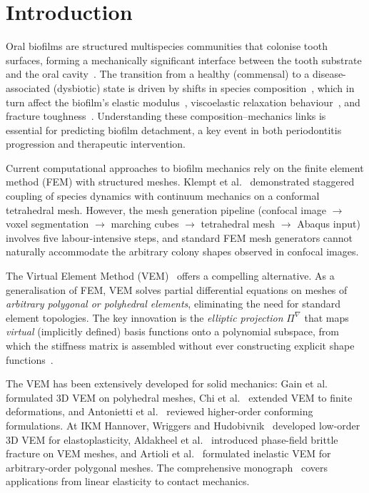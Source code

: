 \documentclass[smallextended]{svjour3}
\begin{document}

\section{Introduction}
\label{sec:intro}

Oral biofilms are structured multispecies communities that colonise tooth
surfaces, forming a mechanically significant interface between the
tooth substrate and the oral cavity~\cite{Flemming2010}.
The transition from a healthy (commensal) to a disease-associated
(dysbiotic) state is driven by shifts in species
composition~\cite{Heine2025}, which in turn affect the biofilm's
elastic modulus~\cite{Pattem2018,Pattem2021}, viscoelastic relaxation
behaviour~\cite{Peterson2015,Stoodley1999}, and fracture
toughness~\cite{Gloag2020a,Gloag2020b}.
Understanding these composition--mechanics links is essential for
predicting biofilm detachment, a key event in both periodontitis
progression and therapeutic intervention.

Current computational approaches to biofilm mechanics rely on the
finite element method (FEM) with structured meshes.
Klempt et al.~\cite{Klempt2024} demonstrated staggered coupling of
species dynamics with continuum mechanics on a conformal tetrahedral
mesh.
However, the mesh generation pipeline (confocal image $\to$ voxel
segmentation $\to$ marching cubes $\to$ tetrahedral mesh $\to$ Abaqus
input) involves five labour-intensive steps, and standard FEM mesh
generators cannot naturally accommodate the arbitrary colony shapes
observed in confocal images.

The Virtual Element Method
(VEM)~\cite{BeiraodaVeiga2013,BeiraodaVeiga2014} offers a compelling
alternative.
As a generalisation of FEM, VEM solves partial differential equations
on meshes of \emph{arbitrary polygonal or polyhedral elements},
eliminating the need for standard element topologies.
The key innovation is the \emph{elliptic projection}
$\Pi^\nabla$ that maps \emph{virtual} (implicitly defined)
basis functions onto a polynomial subspace, from which the
stiffness matrix is assembled without ever constructing
explicit shape functions~\cite{Sutton2017}.

The VEM has been extensively developed for solid mechanics:
Gain et al.~\cite{Gain2014} formulated 3D VEM on polyhedral meshes,
Chi et al.~\cite{Chi2017} extended VEM to finite deformations,
and Antonietti et al.~\cite{Antonietti2022} reviewed higher-order
conforming formulations.
At IKM Hannover,
Wriggers and Hudobivnik~\cite{Wriggers2019} developed low-order 3D
VEM for elastoplasticity,
Aldakheel et al.~\cite{Aldakheel2018} introduced phase-field brittle
fracture on VEM meshes, and
Artioli et al.~\cite{Artioli2017} formulated inelastic VEM for
arbitrary-order polygonal meshes.
The comprehensive monograph~\cite{Wriggers2024} covers applications
from linear elasticity to contact mechanics.
\end{document}
